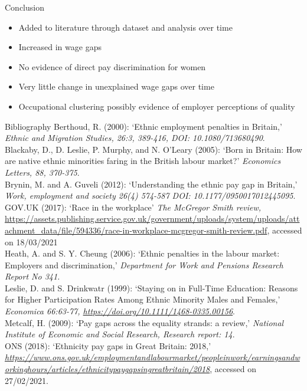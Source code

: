 \documentclass[aspectratio=169,12pt]{beamer}
\begin{document}
\begin{frame}{Conclusion}
	 \begin{itemize}
	    \vspace{-20pt}
	    \item Added to literature through dataset and analysis over time
	    \item Increased in wage gaps
	    \item No evidence of direct pay discrimination for women
	    \item Very little change in unexplained wage gaps over time
	    \item Occupational clustering possibly evidence of employer perceptions of quality
	 \end{itemize}
\end{frame}

\begin{frame}[allowframebreaks]{Bibliography}
\footnotesize{
Berthoud, R. (2000): `Ethnic employment penalties in Britain,' \textit{Ethnic and Migration
Studies, 26:3, 389-416, DOI: 10.1080/713680490}.
\bigskip
\\Blackaby, D., D. Leslie, P. Murphy, and N. O'Leary (2005): `Born in Britain: How are native ethnic minorities faring in the British labour market?' \textit{Economics Letters, 88, 370-375}.
\bigskip
\\Brynin, M. and A. Guveli (2012): `Understanding the ethnic pay gap in Britain,' \textit{Work, employment and society 26(4) 574-587 DOI: 10.1177/0950017012445095}.
\bigskip
\\GOV.UK (2017): \enquote*{Race in the workplace} \textit{The McGregor Smith review,} \url{https://assets.publishing.service.gov.uk/government/uploads/system/uploads/attachment_data/file/594336/race-in-workplace-mcgregor-smith-review.pdf}, accessed on 18/03/2021
\bigskip
\\Heath, A. and S. Y. Cheung (2006): `Ethnic penalties in the labour market: Employers and discrimination,' \textit{Department for Work and Pensions Research Report No 341.}
\bigskip
\\Leslie, D. and S. Drinkwatr (1999): `Staying on in Full-Time Education: Reasons for Higher Participation Rates Among Ethnic Minority Males and Females,' \textit{Economica 66:63-77, \url{https://doi.org/10.1111/1468-0335.00156}}.
\bigskip
\\Metcalf, H. (2009): `Pay gaps across the equality strands: a review,' \textit{National Institute of Economic and Social Research, Research report: 14}.
\vspace{5pt}
\\ONS (2018): `Ethnicity pay gaps in Great Britain: 2018,' \textit{\url{https://www.ons.gov.uk/employmentandlabourmarket/peopleinwork/earningsandworkinghours/articles/ethnicitypaygapsingreatbritain/2018}}, accessed on 27/02/2021.
}
\end{frame}
\end{document}
